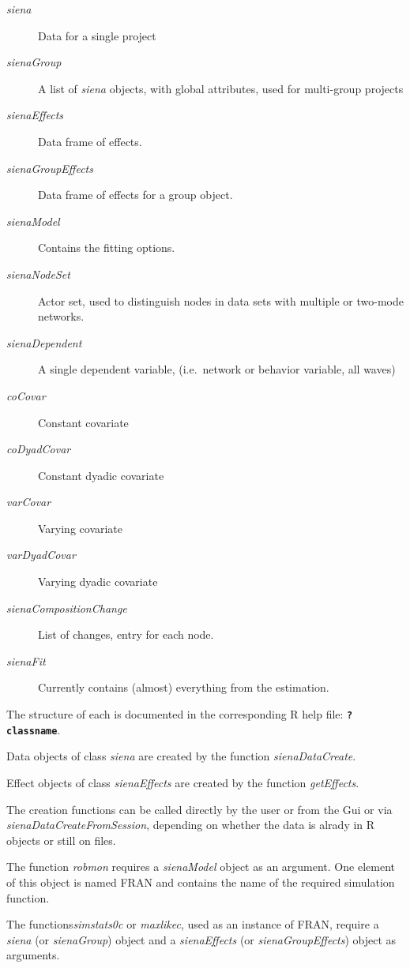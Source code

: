 \documentclass[12pt,a4paper]{article}
\renewcommand{\=}{\,=\,}
\newcommand{\+}{\,+\,}
\newcommand{\nm}[1]{\textsf{ #1}}
\newcommand{\nnm}[1]{\textsf{\textit{#1}}}
\newcommand{\sfn}[1]{\textbf{\texttt{#1}}}
\newcommand{\R}{{\sf R }}
\begin{document}
\begin{description}
\item[\nnm{siena}] Data for a single project
\item[\nnm{sienaGroup}] A list of \nnm{siena} objects, with global attributes,
  used for multi-group projects
\item[\nnm{sienaEffects}] Data frame of effects.
\item[\nnm{sienaGroupEffects}] Data frame of effects for a group object.
\item[\nnm{sienaModel}] Contains the fitting options.
\item[\nnm{sienaNodeSet}] Actor set, used to distinguish nodes in data sets with
  multiple or two-mode networks.
\item[\nnm{sienaDependent}] A single dependent variable, (i.e.\ network or behavior
  variable, all waves)
\item[\nnm{coCovar}] Constant covariate
\item[\nnm{coDyadCovar}] Constant dyadic covariate
\item[\nnm{varCovar}] Varying covariate
\item[\nnm{varDyadCovar}] Varying dyadic covariate
\item[\nnm{sienaCompositionChange}] List of changes, entry for each node.
\item[\nnm{sienaFit}] Currently contains (almost) everything from the
  estimation.
\end{description}

The structure of each is documented in the corresponding \R help file:
\sfn{?classname}.

Data objects of class \nnm{siena} are created by the function
\nnm{sienaDataCreate}.

Effect objects of class \nnm{sienaEffects} are created by the function
\nnm{getEffects}.

The creation functions can be called directly by the user or from the Gui or via
\nnm{sienaDataCreateFromSession}, depending on whether the data is alrady in \R
objects or still on files.

The function \nnm{robmon} requires a \nnm{sienaModel} object
as an argument. One element of this object is named \nm{FRAN} and contains the
name of the required simulation function.

The functions\nnm{simstats0c} or \nnm{maxlikec}, used as an instance of
\nm{FRAN}, require a \nnm{siena} (or \nnm{sienaGroup}) object and a
\nnm{sienaEffects} (or \nnm{sienaGroupEffects}) object as arguments.
\end{document}
